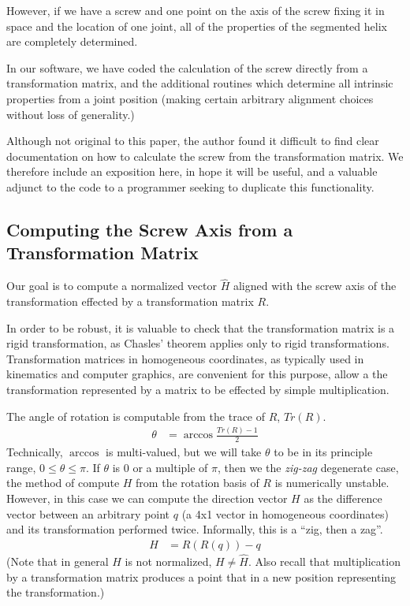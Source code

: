 \documentclass[11pt]{article}
\begin{document}
{However, if we have a screw and one point on the axis of the screw fixing it in space
and the location of one joint, all of the properties of the segmented helix are completely determined.

In our software, we have coded the calculation of the screw directly from a transformation matrix, and
the additional routines which determine all intrinsic properties from a joint position (making
certain arbitrary alignment choices without loss of generality.)

Although not original to this paper, the author found it
difficult to find clear documentation on how to calculate the
screw from the transformation matrix.
We therefore include an exposition here, in hope it will be useful,
and a valuable adjunct to the code to a programmer seeking to duplicate
this functionality.

\subsection{Computing the Screw Axis from a Transformation Matrix}

Our goal is to compute a normalized vector $\hat{H}$ aligned with the screw
axis of the transformation effected by a transformation matrix $R$.

In order to be robust, it is valuable to check that the transformation
matrix is a rigid transformation\cite{wiki:rigid},
as Chasles' theorem applies only to rigid transformations.
Transformation matrices in homogeneous coordinates, as typically used in kinematics
and computer graphics, are convenient for this purpose, allow a the transformation
represented by a matrix to be effected by simple multiplication.

The angle of rotation is computable from the trace of $R$, $Tr(R)$.
\begin{align}
  \theta &= \arccos{\frac{Tr(R) - 1}{2}}
\end{align}
Technically, $\arccos$ is multi-valued, but we will take $\theta$
to be in its principle range, $0 \leq \theta \leq \pi$.
If $\theta$ is $0$ or a multiple of $\pi$, then we the {\em zig-zag}
degenerate case, the method of compute $H$ from the rotation
basis of $R$ is numerically unstable. However, in this case
we can compute the direction vector $H$ as the difference vector
between an arbitrary point $q$ (a 4x1 vector in homogeneous coordinates)
and its transformation performed
twice. Informally, this is a ``zig, then a zag''.
\begin{align}
  H &= R ( R( q)) - q
\end{align}
(Note that in general $H$ is not normalized, $H \neq \hat{H}$.
Also recall that multiplication by a transformation matrix
produces a point that in a new position representing
the transformation.)

}
\end{document}
